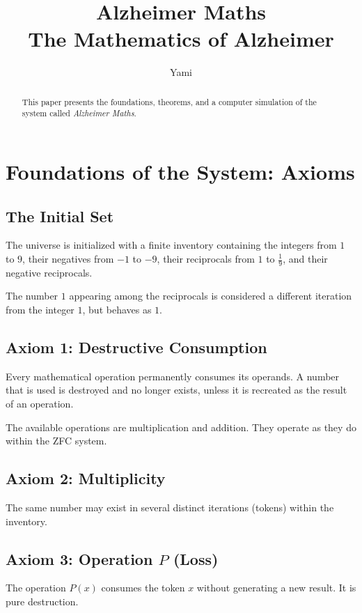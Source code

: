 \documentclass[12pt,a4paper]{article}
\title{\textbf{Alzheimer Maths}\\
\large The Mathematics of Alzheimer}
\author{Yami}
\date{}
\begin{document}
\maketitle

\begin{abstract}
This paper presents the foundations, theorems, and a computer
simulation of the system called \textit{Alzheimer Maths}.
\end{abstract}

\section{Foundations of the System: Axioms}

\subsection{The Initial Set}

The universe is initialized with a finite inventory containing the
integers from $1$ to $9$, their negatives from $-1$ to $-9$, their
reciprocals from $1$ to $\frac{1}{9}$, and their negative reciprocals.

The number $1$ appearing among the reciprocals is considered a
different iteration from the integer $1$, but behaves as $1$.

\subsection{Axiom 1: Destructive Consumption}

Every mathematical operation permanently consumes its operands.
A number that is used is destroyed and no longer exists, unless it
is recreated as the result of an operation.

The available operations are multiplication and addition. They
operate as they do within the ZFC system.

\subsection{Axiom 2: Multiplicity}

The same number may exist in several distinct iterations (tokens)
within the inventory.

\subsection{Axiom 3: Operation $P$ (Loss)}

The operation $P(x)$ consumes the token $x$ without generating
a new result. It is pure destruction.
\end{document}
